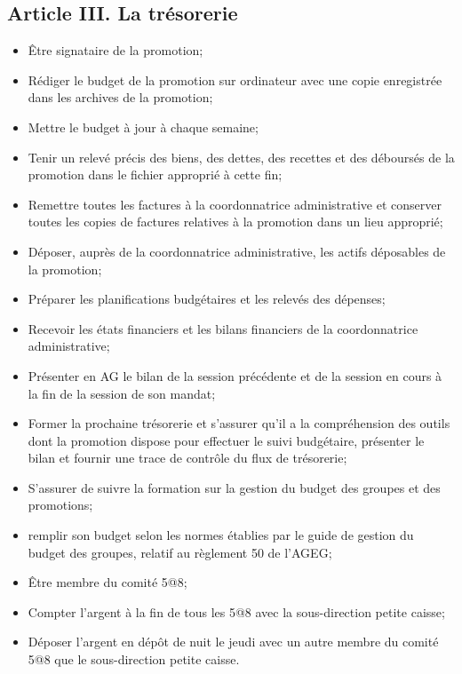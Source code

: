 \subsection*{Article III. La trésorerie}
\begin{itemize}
    \item Être signataire de la promotion;
    \item Rédiger le budget de la promotion sur ordinateur avec une copie enregistrée dans les archives de la promotion;
    \item Mettre le budget à jour à chaque semaine;
    \item Tenir un relevé précis des biens, des dettes, des recettes et des déboursés de la promotion dans le fichier approprié à cette fin;
    \item Remettre toutes les factures à la coordonnatrice administrative et conserver toutes les copies de factures relatives à la promotion dans un lieu approprié;
    \item Déposer, auprès de la coordonnatrice administrative, les actifs déposables de la promotion;
    \item Préparer les planifications budgétaires et les relevés des dépenses;
    \item Recevoir les états financiers et les bilans financiers de la coordonnatrice administrative;
    \item Présenter en AG le bilan de la session précédente et de la session en cours à la fin de la session de son mandat;
    \item Former la prochaine trésorerie et s’assurer qu'il a la compréhension des outils dont la promotion dispose pour effectuer le suivi budgétaire, présenter le bilan et fournir une trace de contrôle du flux de trésorerie;
    \item S'assurer de suivre la formation sur la gestion du budget des groupes et des promotions;
    \item remplir son budget selon les normes établies par le guide de gestion du budget des groupes, relatif au règlement 50 de l'AGEG;
    \item Être membre du comité 5@8;
    \item Compter l’argent à la fin de tous les 5@8 avec la sous-direction petite caisse;
    \item Déposer l’argent en dépôt de nuit le jeudi avec un autre membre du comité 5@8 que le sous-direction petite caisse.
\end{itemize}
 
